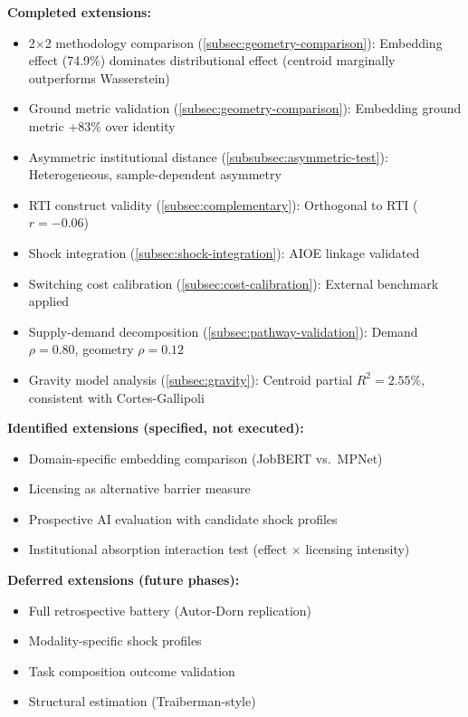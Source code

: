 \documentclass[12pt]{article}
\begin{document}
\textbf{Completed extensions:}
\begin{itemize}
    \item 2$\times$2 methodology comparison (\cref{subsec:geometry-comparison}): Embedding effect (74.9\%) dominates distributional effect (centroid marginally outperforms Wasserstein)
    \item Ground metric validation (\cref{subsec:geometry-comparison}): Embedding ground metric +83\% over identity
    \item Asymmetric institutional distance (\cref{subsubsec:asymmetric-test}): Heterogeneous, sample-dependent asymmetry
    \item RTI construct validity (\cref{subsec:complementary}): Orthogonal to RTI ($r = -0.06$)
    \item Shock integration (\cref{subsec:shock-integration}): AIOE linkage validated
    \item Switching cost calibration (\cref{subsec:cost-calibration}): External benchmark applied
    \item Supply-demand decomposition (\cref{subsec:pathway-validation}): Demand $\rho = 0.80$, geometry $\rho = 0.12$
    \item Gravity model analysis (\cref{subsec:gravity}): Centroid partial $R^2 = 2.55\%$, consistent with Cortes-Gallipoli
\end{itemize}

\textbf{Identified extensions (specified, not executed):}
\begin{itemize}
    \item Domain-specific embedding comparison (JobBERT vs.\ MPNet)
    \item Licensing as alternative barrier measure
    \item Prospective AI evaluation with candidate shock profiles
    \item Institutional absorption interaction test (effect $\times$ licensing intensity)
\end{itemize}

\textbf{Deferred extensions (future phases):}
\begin{itemize}
    \item Full retrospective battery (Autor-Dorn replication)
    \item Modality-specific shock profiles
    \item Task composition outcome validation
    \item Structural estimation (Traiberman-style)
\end{itemize}
\end{document}

